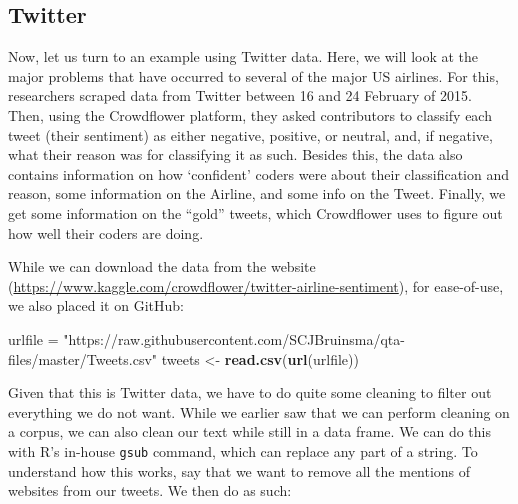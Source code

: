 \documentclass[
]{book}
\newenvironment{Shaded}{\begin{snugshade}}{\end{snugshade}}
\newcommand{\FunctionTok}[1]{\textcolor[rgb]{0.13,0.29,0.53}{\textbf{#1}}}
\newcommand{\NormalTok}[1]{#1}
\newcommand{\OtherTok}[1]{\textcolor[rgb]{0.56,0.35,0.01}{#1}}
\newcommand{\SpecialCharTok}[1]{\textcolor[rgb]{0.81,0.36,0.00}{\textbf{#1}}}
\newcommand{\StringTok}[1]{\textcolor[rgb]{0.31,0.60,0.02}{#1}}
\begin{document}
\subsection{Twitter}\label{twitter}

Now, let us turn to an example using Twitter data. Here, we will look at the major problems that have occurred to several of the major US airlines. For this, researchers scraped data from Twitter between 16 and 24 February of 2015. Then, using the Crowdflower platform, they asked contributors to classify each tweet (their sentiment) as either negative, positive, or neutral, and, if negative, what their reason was for classifying it as such. Besides this, the data also contains information on how `confident' coders were about their classification and reason, some information on the Airline, and some info on the Tweet. Finally, we get some information on the ``gold'' tweets, which Crowdflower uses to figure out how well their coders are doing.

While we can download the data from the website (\url{https://www.kaggle.com/crowdflower/twitter-airline-sentiment}), for ease-of-use, we also placed it on GitHub:

\begin{Shaded}
\begin{Highlighting}[]
\NormalTok{urlfile }\OtherTok{=} \StringTok{"https://raw.githubusercontent.com/SCJBruinsma/qta{-}files/master/Tweets.csv"}
\NormalTok{tweets }\OtherTok{\textless{}{-}} \FunctionTok{read.csv}\NormalTok{(}\FunctionTok{url}\NormalTok{(urlfile))}
\end{Highlighting}
\end{Shaded}

Given that this is Twitter data, we have to do quite some cleaning to filter out everything we do not want. While we earlier saw that we can perform cleaning on a corpus, we can also clean our text while still in a data frame. We can do this with R's in-house \texttt{gsub} command, which can replace any part of a string. To understand how this works, say that we want to remove all the mentions of websites from our tweets. We then do as such:

\begin{Shaded}
\end{Shaded}
\end{document}
